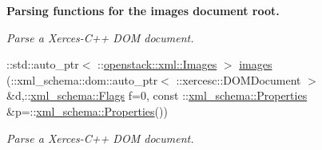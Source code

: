 \begin{Indent}{\bf Parsing functions for the images document root.}
\begin{DoxyCompactItemize}
\begin{DoxyCompactList}\small\item\em Parse a Xerces-\/C++ DOM document. \item\end{DoxyCompactList}\item 
::std::auto\_\-ptr$<$ ::\hyperlink{classopenstack_1_1xml_1_1Images}{openstack::xml::Images} $>$ \hyperlink{namespaceopenstack_1_1xml_ab4bd438e68171de5487d5b0d6bd10d29}{images} (::xml\_\-schema::dom::auto\_\-ptr$<$ ::xercesc::DOMDocument $>$ \&d,::\hyperlink{namespacexml__schema_affb4c227cbd9aa7453dd1dc5a1401943}{xml\_\-schema::Flags} f=0, const ::\hyperlink{namespacexml__schema_ad27ce19a7ee1d3b1064092648898f64c}{xml\_\-schema::Properties} \&p=::\hyperlink{namespacexml__schema_ad27ce19a7ee1d3b1064092648898f64c}{xml\_\-schema::Properties}())
\begin{DoxyCompactList}\small\item\em Parse a Xerces-\/C++ DOM document. \item\end{DoxyCompactList}\end{DoxyCompactItemize}
\end{Indent}
